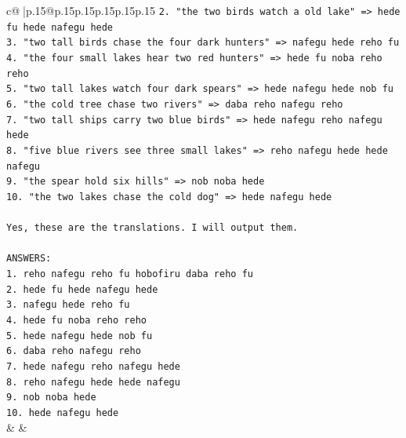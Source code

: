 \documentclass{article}
\begin{document}
{\begin{supertabular}{c@{$\;$}|p{.15\linewidth}@{}p{.15\linewidth}p{.15\linewidth}p{.15\linewidth}p{.15\linewidth}p{.15\linewidth}}
{{{\texttt{2. "the two birds watch a old lake" => hede fu hede nafegu hede} \\
\texttt{3. "two tall birds chase the four dark hunters" => nafegu hede reho fu} \\
\texttt{4. "the four small lakes hear two red hunters" => hede fu noba reho reho} \\
\texttt{5. "two tall lakes watch four dark spears" => hede nafegu hede nob fu} \\
\texttt{6. "the cold tree chase two rivers" => daba reho nafegu reho} \\
\texttt{7. "two tall ships carry two blue birds" => hede nafegu reho nafegu hede} \\
\texttt{8. "five blue rivers see three small lakes" => reho nafegu hede hede nafegu} \\
\texttt{9. "the spear hold six hills" => nob noba hede} \\
\texttt{10. "the two lakes chase the cold dog" => hede nafegu hede} \\
\\ 
\texttt{Yes, these are the translations. I will output them.} \\
\\ 
\texttt{ANSWERS:} \\
\texttt{1. reho nafegu reho fu hobofiru daba reho fu} \\
\texttt{2. hede fu hede nafegu hede} \\
\texttt{3. nafegu hede reho fu} \\
\texttt{4. hede fu noba reho reho} \\
\texttt{5. hede nafegu hede nob fu} \\
\texttt{6. daba reho nafegu reho} \\
\texttt{7. hede nafegu reho nafegu hede} \\
\texttt{8. reho nafegu hede hede nafegu} \\
\texttt{9. nob noba hede} \\
\texttt{10. hede nafegu hede} \\
            }
        }
    }
    & & \\ \\


\end{supertabular}}
\end{document}
